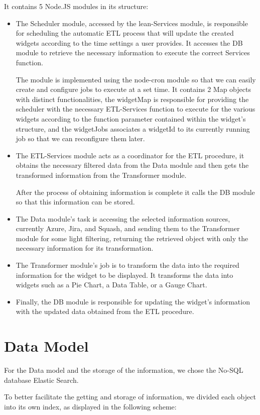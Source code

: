 \documentclass[a4paper,twoside,10pt]{report}
\begin{document}
It contains 5 Node.JS modules in its structure:
\begin{itemize}
 \item The Scheduler module, accessed by the lean-Services module, is responsible for scheduling the automatic ETL process that will update the created widgets according to the time settings a user provides. It accesses the DB module to retrieve the necessary information to execute the correct Services function.

The module is implemented using the node-cron\cite{NODECRON} module so that we can easily create and configure jobs to execute at a set time.
It contains 2 Map objects with distinct functionalities, the widgetMap is responsible for providing the scheduler with the necessary ETL-Services function to execute for the various widgets according to the function parameter contained within the widget's structure, and the widgetJobs associates a widgetId to its currently running job so that we can reconfigure them later.
 \item The ETL-Services module acts as a coordinator for the ETL procedure, it obtains the necessary filtered data from the Data module and then gets the transformed information from the Transformer module.

After the process of obtaining information is complete it calls the DB module so that this information can be stored.
 \item The Data module's task is accessing the selected information sources, currently Azure, Jira, and Squash, and sending them to the Transformer module for some light filtering, returning the retrieved object with only the necessary information for its transformation.
 \item The Transformer module's job is to transform the data into the required information for the widget to be displayed. It transforms the data into widgets such as a Pie Chart, a Data Table, or a Gauge Chart.
 \item Finally, the DB module is responsible for updating the widget's information with the updated data obtained from the ETL procedure.
\end{itemize}

\newpage
\section{Data Model}
For the Data model and the storage of the information, we chose the No-SQL database Elastic Search.
 
To better facilitate the getting and storage of information, we divided each object into its own index, as displayed in the following scheme:
\end{document}
